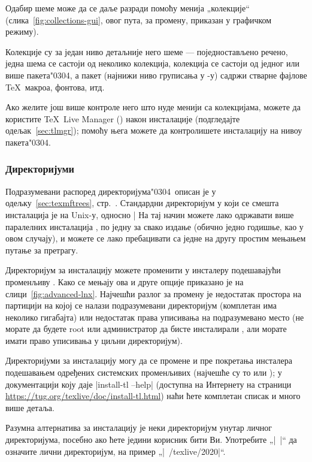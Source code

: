 \documentclass{article}
\begin{document}
Одабир шеме може да се даље разради помоћу менија „колекције“
(слика~\ref{fig:collections-gui}, овог пута, за промену, приказан
у графичком режиму).

Колекције су за један ниво детаљније него шеме --- поједностављено
речено, једна шема се састоји од неколико колекција, колекција се
састоји од једног или више пакета\char"0304, а пакет (најнижи ниво
груписања у \TL-у) садржи стварне фајлове \TeX\ макроа, фонтова, итд.

Ако желите још више контроле него што нуде менији са колекцијама,
можете да користите \textenglish{\TeX\ Live Manager} ()
након инсталације (подгледајте одељак~\ref{sec:tlmgr}); помоћу њега
можете да контролишете инсталацију на нивоу пакета\char"0304.

\subsubsection{Директоријуми}
\label{sec:directories}

Подразумевани распоред директоријума\char"0304\ описан је у
одељку~\ref{sec:texmftrees}, стр.~\pageref{sec:texmftrees}.
Стандардни директоријум у који се смешта инсталација је
 на Unix-у, односно
|%
На тај начин можете лако одржавати више паралелних инсталација \TL,
по једну за свако издање (обично једно годишње, као у овом случају),
и можете се лако пребацивати са једне на другу простим мењањем
путање за претрагу.

Директоријум за инсталацију можете променити у инсталеру подешавајући
променљиву . Како се мењају ова и друге опције
приказано је на слици~\ref{fig:advanced-lnx}. Најчешћи разлог за промену
је недостатак простора на партицији на којој се налази подразумевани
директоријум (комплетан \TL{} има неколико гигабајта) или недостатак
права уписивања на подразумевано место (не морате да будете root или
администратор да бисте инсталирали \TL, али морате имати право
уписивања у циљни директоријум).

Директоријуми за инсталацију могу да се промене и пре покретања
инсталера подешавањем одређених системских променљивих (најчешће су
то  или
); у документацији коју даје
|install-tl --help| (доступна на Интернету на страници
\url{https://tug.org/texlive/doc/install-tl.html}) наћи ћете комплетан
списак и много више детаља.

Разумна алтернатива за инсталацију је неки директоријум унутар личног
директоријума, посебно ако ћете једини корисник бити Ви. Употребите
„|~|“ да означите лични директоријум, на пример „|~/texlive/2020|“.
\end{document}
